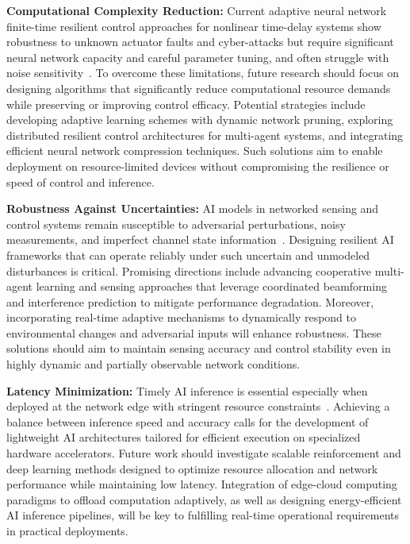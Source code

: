 \documentclass[sigconf]{acmart}
\begin{document}
\textbf{Computational Complexity Reduction:} Current adaptive neural network finite-time resilient control approaches for nonlinear time-delay systems show robustness to unknown actuator faults and cyber-attacks but require significant neural network capacity and careful parameter tuning, and often struggle with noise sensitivity~\cite{ref46}. To overcome these limitations, future research should focus on designing algorithms that significantly reduce computational resource demands while preserving or improving control efficacy. Potential strategies include developing adaptive learning schemes with dynamic network pruning, exploring distributed resilient control architectures for multi-agent systems, and integrating efficient neural network compression techniques. Such solutions aim to enable deployment on resource-limited devices without compromising the resilience or speed of control and inference.

\textbf{Robustness Against Uncertainties:} AI models in networked sensing and control systems remain susceptible to adversarial perturbations, noisy measurements, and imperfect channel state information~\cite{ref48}. Designing resilient AI frameworks that can operate reliably under such uncertain and unmodeled disturbances is critical. Promising directions include advancing cooperative multi-agent learning and sensing approaches that leverage coordinated beamforming and interference prediction to mitigate performance degradation. Moreover, incorporating real-time adaptive mechanisms to dynamically respond to environmental changes and adversarial inputs will enhance robustness. These solutions should aim to maintain sensing accuracy and control stability even in highly dynamic and partially observable network conditions.

\textbf{Latency Minimization:} Timely AI inference is essential especially when deployed at the network edge with stringent resource constraints~\cite{ref50}. Achieving a balance between inference speed and accuracy calls for the development of lightweight AI architectures tailored for efficient execution on specialized hardware accelerators. Future work should investigate scalable reinforcement and deep learning methods designed to optimize resource allocation and network performance while maintaining low latency. Integration of edge-cloud computing paradigms to offload computation adaptively, as well as designing energy-efficient AI inference pipelines, will be key to fulfilling real-time operational requirements in practical deployments.
\end{document}
